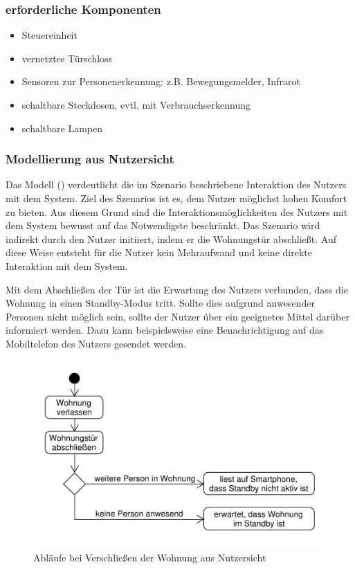 \subsubsection{erforderliche Komponenten}
\begin{itemize}
	\item Steuereinheit
	\item vernetztes Türschloss
	\item Sensoren zur Personenerkennung: z.B. Bewegungsmelder, Infrarot
	\item schaltbare Steckdosen, evtl. mit Verbrauchserkennung
	\item schaltbare Lampen
\end{itemize}


\subsubsection{Modellierung aus Nutzersicht}
Das Modell () verdeutlicht die im Szenario beschriebene Interaktion des Nutzers mit dem System. Ziel des Szenarios ist es, dem Nutzer möglichst hohen Komfort zu bieten. Aus diesem Grund sind die Interaktionsmöglichkeiten des Nutzers mit dem System bewusst auf das Notwendigste beschränkt. Das Szenario wird indirekt durch den Nutzer initiiert, indem er die Wohnungstür abschließt. Auf diese Weise entsteht für die Nutzer kein Mehraufwand und keine direkte Interaktion mit dem System.

Mit dem Abschließen der Tür ist die Erwartung des Nutzers verbunden, dass die Wohnung in einen Standby-Modus tritt. Sollte dies aufgrund anwesender Personen nicht möglich sein, sollte der Nutzer über ein geeignetes Mittel darüber informiert werden. Dazu kann beispielsweise eine Benachrichtigung auf das Mobiltelefon des Nutzers gesendet werden.

\newpage

\begin{figure}[h!]
	\centering
	\includegraphics[scale=0.7]{img/Szenarien/WohnungSchliessenNutzersicht.pdf}
	\caption{Abläufe bei Verschließen der Wohnung aus Nutzersicht}
	\label{fig:szenarienStandbyNutzersicht}
\end{figure}

